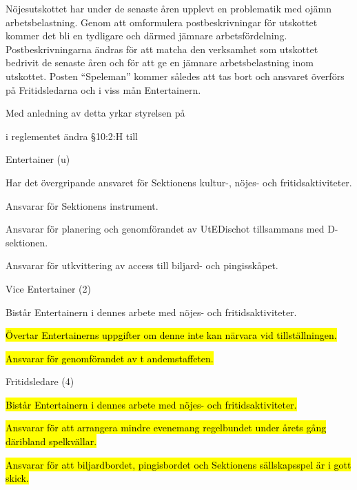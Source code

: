 \documentclass[../_main/handlingar.tex]{subfiles}
\begin{document}
Nöjesutskottet har under de senaste åren upplevt en problematik med ojämn arbetsbelastning. Genom att omformulera postbeskrivningar för utskottet kommer det bli en tydligare och därmed jämnare arbetsfördelning. Postbeskrivningarna ändras för att matcha den verksamhet som utskottet bedrivit de senaste åren och för att ge en jämnare arbetsbelastning inom utskottet. Posten “Speleman” kommer således att tas bort och ansvaret överförs på Fritidsledarna och i viss mån Entertainern.

Med anledning av detta yrkar styrelsen på
\begin{attsatser}
    \att i reglementet ändra \S10:2:H till\par
      Entertainer (u)
        \begin{tightdashlist}
            \item Har det övergripande ansvaret för Sektionens kultur-, nöjes- och fritidsaktiviteter.
            \item Ansvarar för Sektionens instrument.
            \item Ansvarar för planering och genomförandet av UtEDischot tillsammans med D-sektionen.
            \item Ansvarar för utkvittering av access till biljard- och pingisskåpet.
        \end{tightdashlist}

      Vice Entertainer (2)
          \begin{tightdashlist}
              \item Bistår Entertainern i dennes arbete med nöjes- och fritidsaktiviteter.
              \item \hl{Övertar Entertainerns uppgifter om denne inte kan närvara vid tillställningen.}
              \item \hl{Ansvarar för genomförandet av t andemstaffeten.}
          \end{tightdashlist}

      Fritidsledare (4)
          \begin{tightdashlist}
              \item \hl{Bistår Entertainern i dennes arbete med nöjes- och fritidsaktiviteter.}
              \item \hl{Ansvarar för att arrangera mindre evenemang regelbundet under årets gång däribland spelkvällar.}
              \item \hl{Ansvarar för att biljardbordet, pingisbordet och Sektionens sällskapsspel är i gott skick.}
          \end{tightdashlist}


\end{attsatser}
\end{document}
